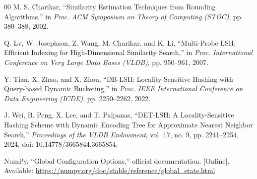 \documentclass[conference]{IEEEtran}
\begin{document}
\begin{thebibliography}{00}
M. S. Charikar,
``Similarity Estimation Techniques from Rounding Algorithms,''
in \textit{Proc. ACM Symposium on Theory of Computing (STOC)},
pp. 380--388, 2002.

Q. Lv, W. Josephson, Z. Wang, M. Charikar, and K. Li,
``Multi-Probe LSH: Efficient Indexing for High-Dimensional Similarity Search,''
in \textit{Proc. International Conference on Very Large Data Bases (VLDB)},
pp. 950--961, 2007.

Y. Tian, X. Zhao, and X. Zhou,
``DB-LSH: Locality-Sensitive Hashing with Query-based Dynamic Bucketing,''
in \textit{Proc. IEEE International Conference on Data Engineering (ICDE)},
pp. 2250--2262, 2022.

J. Wei, B. Peng, X. Lee, and T. Palpanas,
``DET-LSH: A Locality-Sensitive Hashing Scheme with Dynamic Encoding Tree for Approximate Nearest Neighbor Search,''
\textit{Proceedings of the VLDB Endowment},
vol. 17, no. 9, pp. 2241--2254, 2024,
doi: 10.14778/3665844.3665854.

NumPy,
``Global Configuration Options,''
official documentation. [Online].
Available: \url{https://numpy.org/doc/stable/reference/global_state.html}

\end{thebibliography}
\end{document}
